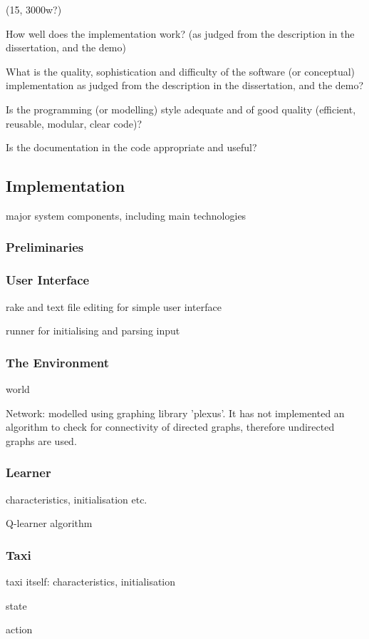 (15, 3000w?)

How well does the implementation work? (as judged from the description in the
dissertation, and the demo)

What is the quality, sophistication and difficulty of the software (or
conceptual) implementation as judged from the description in the dissertation,
and the demo?

Is the programming (or modelling) style adequate and of good quality
(efficient, reusable, modular, clear code)?

Is the documentation in the code appropriate and useful?


\subsection{Implementation}

major system components, including main technologies



\subsubsection{Preliminaries}



\subsubsection{User Interface}

rake and text file editing for simple user interface

runner for initialising and parsing input 


\subsubsection{The Environment}

world

Network: modelled using graphing library 'plexus'. It has not implemented an
algorithm to check for connectivity of directed graphs, therefore undirected
graphs are used.


\subsubsection{Learner}

characteristics, initialisation etc.

Q-learner algorithm


\subsubsection{Taxi}

taxi itself: characteristics, initialisation

state

action
